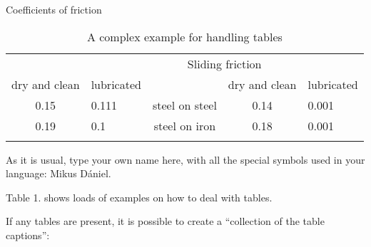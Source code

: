 \documentclass{article}
\begin{document}
\begin{table}[]
    \caption{A complex example for handling tables}
    \centering
    \renewcommand{\caption}[1]{#1}
   \caption{Coefficients of friction} \\
    \begin{tabular}{||c|l|c|c|l||}
     \hhline{|t:=====:t|}
        \multicolumn{2}{||c|}{Static friction} &  & \multicolumn{2}{|c||}{Sliding friction} \\
        \hhline{|#--#~#--#|}
        dry and clean  & lubricated &  & dry and clean & lubricated  \\
        \hhline{|:=====:|}
        0.15 & 0.111 & steel on steel & 0.14 & 0.001  \\
        \hhline{||}
        0.19  & 0.1 & steel on iron & 0.18 & 0.001 \\
        \hhline{|b:=====:b|}
    \end{tabular}
    \label{tab:my_label}
\end{table}
\par
As it is usual, type your own name here, with all the special symbols used in your language: Mikus Dániel. \par
Table 1. shows loads of examples on how to deal with tables. \par
If any tables are present, it is possible to create a “collection of the table captions”:
\listoftables
\end{document}

